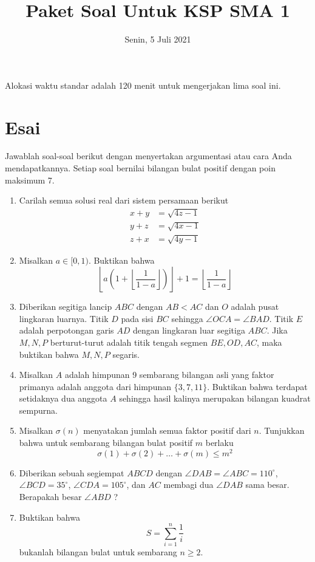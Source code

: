 \documentclass[12pt]{scrartcl}
\title{Paket Soal Untuk KSP SMA 1}
\date{Senin, 5 Juli 2021}
\begin{document}
	\maketitle

\renewcommand*\contentsname{Daftar Isi}
\tableofcontents

\newpage
	Alokasi waktu standar adalah 120 menit untuk mengerjakan lima soal ini.


\section{Esai}
Jawablah soal-soal berikut dengan menyertakan argumentasi atau cara Anda mendapatkannya. Setiap soal bernilai bilangan bulat positif dengan poin maksimum 7.

\begin{enumerate}[resume]
	\item Carilah semua solusi real dari sistem persamaan berikut
	\begin{align*}
		x+y &= \sqrt{4z-1} \\
		y+z &= \sqrt{4x-1} \\
		z+x &= \sqrt{4y-1}
	\end{align*}

	\item Misalkan $a \in [0,1)$. Buktikan bahwa
	$$ \left \lfloor a \left ( 1 + \left \lfloor \frac{1}{1-a} \right \rfloor \right) \right \rfloor + 1 = \left \lfloor \frac{1}{1-a} \right \rfloor$$
	
	\item Diberikan segitiga lancip $ABC$ dengan $AB < AC$ dan $O$ adalah pusat lingkaran luarnya. Titik $D$ pada sisi $BC$ sehingga $\angle OCA = \angle BAD$. Titik $E$ adalah perpotongan garis $AD$ dengan lingkaran luar segitiga $ABC$. Jika $M,N,P$ berturut-turut adalah titik tengah segmen $BE,OD,AC$, maka buktikan bahwa $M,N,P$ segaris.
	
	\item Misalkan $A$ adalah himpunan 9 sembarang bilangan asli yang faktor primanya adalah anggota dari himpunan $\{3,7,11\}$. Buktikan bahwa terdapat setidaknya dua anggota $A$ sehingga hasil kalinya merupakan bilangan kuadrat sempurna.
	
	\item Misalkan $\sigma (n)$ menyatakan jumlah semua faktor positif dari $n$. Tunjukkan bahwa untuk sembarang bilangan bulat positif $m$ berlaku $$\sigma(1)+\sigma(2)+\dots+\sigma(m) \le m^2$$
	
	\item Diberikan sebuah segiempat $ABCD$ dengan $\angle DAB = \angle ABC = 110^\circ$, $\angle BCD = 35^\circ$, $\angle CDA = 105^\circ$, dan $AC$ membagi dua $\angle DAB$ sama besar. Berapakah besar $\angle ABD$ ?
	
	\item Buktikan bahwa $$S=\sum_{i=1}^{n} \frac{1}{i}$$ bukanlah bilangan bulat untuk sembarang $n \ge 2$.
\end{enumerate}
\end{document}
